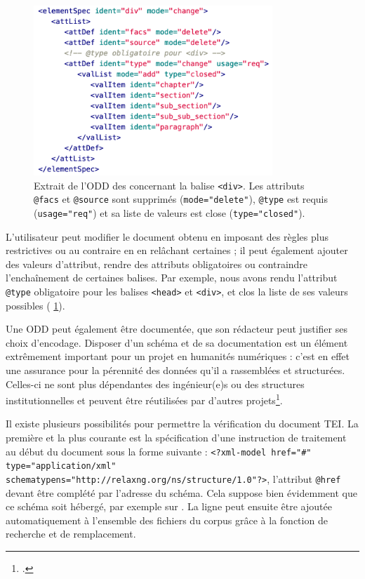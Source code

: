 \begin{figure}[h]
    \centering
    \includegraphics[width=9cm]{img/odd.png}
    \caption[Extrait de l'ODD concernant la balise \texttt{<div>}]{Extrait de l'ODD des \odm{} concernant la balise \texttt{<div>}. Les attributs \texttt{@facs} et \texttt{@source} sont supprimés (\texttt{mode="delete"}), \texttt{@type} est requis (\texttt{usage="req"}) et sa liste de valeurs est close (\texttt{type="closed"}).}
    \label{fig:tei-odd-rng}
\end{figure}

L'utilisateur peut modifier le document obtenu en imposant des règles plus restrictives ou au contraire en en relâchant certaines ; il peut également ajouter des valeurs d'attribut, rendre des attributs obligatoires ou contraindre l'enchaînement de certaines balises. Par exemple, nous avons rendu l'attribut \texttt{@type} obligatoire pour les balises \texttt{<head>} et \texttt{<div>}, et clos la liste de ses valeurs possibles (\fig{} \ref{fig:tei-odd-rng}).

Une ODD peut également être documentée, \cad{} que son rédacteur peut justifier ses choix d'encodage. Disposer d'un schéma et de sa documentation est un élément extrêmement important pour un projet en humanités numériques : c'est en effet une assurance pour la pérennité des données qu'il a rassemblées et structurées. Celles-ci ne sont plus dépendantes des ingénieur(e)s ou des structures institutionnelles et peuvent être réutilisées par d'autres projets\footcite[p. 61]{jolivet}.

Il existe plusieurs possibilités pour permettre la vérification du document TEI. La première et la plus courante est la spécification d'une instruction de traitement au début du document sous la forme suivante : \texttt{<?xml-model href="\#" type="application/xml" schematypens="http://relaxng.org/ns/structure/1.0"?>}, l'attribut \texttt{@href} devant être complété par l'adresse du schéma. Cela suppose bien évidemment que ce schéma soit hébergé, par exemple sur \gitlab. La ligne peut ensuite être ajoutée automatiquement à l'ensemble des fichiers du corpus grâce à la fonction de recherche et de remplacement.

